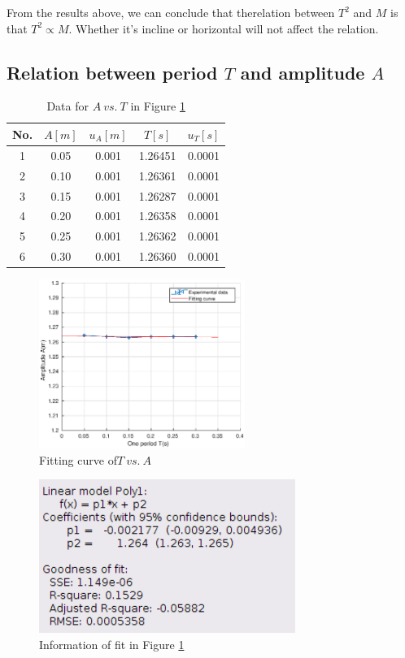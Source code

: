     From the results above, we can conclude that therelation between $T^2$ and $M$ is that $T^2\propto M$. Whether it's incline or horizontal will not affect the relation. 

\subsection{Relation between period $T$ and amplitude $A$}
    \begin{table}[h] \small
        \centering
        \begin{tabular}{|c|c|c|c|c|}
            \hline
            No. & $A[m]$ & $u_{A}[m]$ & $T[s]$ & $u_{T}[s]$\\ \hline
            1 & 0.05 & 0.001 & 1.26451 & 0.0001\\ \hline
            2 & 0.10 & 0.001 & 1.26361 & 0.0001\\ \hline
            3 & 0.15 & 0.001 & 1.26287 & 0.0001\\ \hline
            4 & 0.20 & 0.001 & 1.26358 & 0.0001\\ \hline
            5 & 0.25 & 0.001 & 1.26362 & 0.0001\\ \hline
            6 & 0.30 & 0.001 & 1.26360 & 0.0001\\ \hline
        \end{tabular}
        \caption{Data for $A\ vs.\ T$ in Figure \ref{at}}\label{atdata}
    \end{table}
    \begin{figure}[!h]
        \centering
        \includegraphics[height=5.5cm]{images/at.eps}
        \caption{Fitting curve of$T\ vs.\ A$}\label{at}
    \end{figure}
    \begin{figure}[h]
        \centering
        \includegraphics[height=5cm]{images/atinfo.png}
        \caption{Information of fit in Figure \ref{at}}\label{atinfo}
    \end{figure}